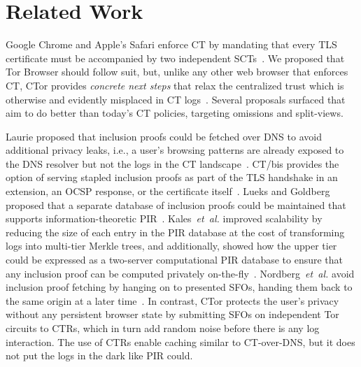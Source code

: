 \section{Related Work} \label{sec:related}
Google Chrome and Apple's Safari enforce CT by mandating that every TLS
certificate must be accompanied by two independent
SCTs~\cite{chrome-policy,safari-policy}.  We proposed that Tor Browser should
follow suit, but, unlike any other web browser that enforces CT, CTor provides
\emph{concrete next steps} that relax the centralized trust which is otherwise
and evidently misplaced in CT logs~\cite{%
	izenpe-disqualified,%
	venafi-disqualified,%
	gdca1-omission,%
	digicert-log-compromised%
}.  Several proposals surfaced that aim to do better than today's CT
policies, targeting omissions and split-views.

Laurie proposed that inclusion proofs could be fetched over DNS to avoid
additional privacy leaks, i.e., a user's browsing patterns are already exposed
to the DNS resolver but not the logs in the CT landscape~\cite{ct-over-dns}.
CT/bis provides the option of serving stapled inclusion proofs as part of the
TLS handshake in an extension, an OCSP response, or the certificate
itself~\cite{ct/bis}. Lueks and Goldberg proposed that a separate database of
inclusion proofs could be maintained that supports information-theoretic
PIR~\cite{lueks-and-goldberg}. Kales~\emph{et~al.} improved scalability by
reducing the size of each entry in the PIR database at the cost of transforming
logs into multi-tier Merkle trees, and additionally, showed how the upper tier
could be expressed as a two-server computational PIR database to ensure that any
inclusion proof can be computed privately on-the-fly~\cite{kales}.
Nordberg~\emph{et~al.} avoid inclusion proof fetching by hanging on to presented
SFOs, handing them back to the same origin at a later time~\cite{nordberg}. In
contrast, CTor protects the user's privacy without any persistent browser state
by submitting SFOs on independent Tor circuits to CTRs, which in turn add random
noise before there is any log interaction.  The use of CTRs enable caching
similar to CT-over-DNS, but it does not put the logs in the dark like PIR could.

